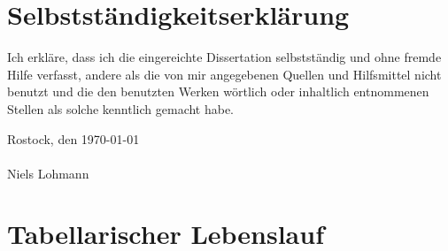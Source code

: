 \begingroup
\let\clearpage\relax
\let\cleardoublepage\relax
\let\cleardoublepage\relax



\chapter*{Selbstst\"andigkeitserkl\"arung}

Ich erkl\"are, dass ich die eingereichte Dissertation selbstst\"andig und ohne fremde Hilfe verfasst, andere als die von mir angegebenen Quellen und Hilfsmittel nicht benutzt und die den benutzten Werken w\"ortlich oder inhaltlich entnommenen Stellen als solche kenntlich gemacht habe.

\vspace{2em}
\noindent Rostock, den \today\\%
\vspace{3em}\\\noindent Niels Lohmann

\vfill
\pagebreak

\chapter*{Tabellarischer Lebenslauf}

